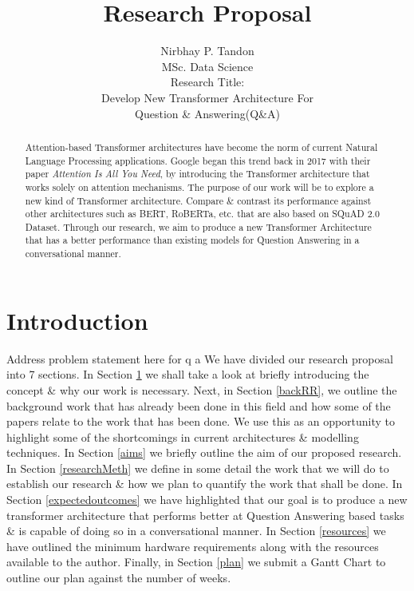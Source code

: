 \documentclass[11pt]{article}
\begin{document}
\title{Research Proposal}

\author{Nirbhay P. Tandon\\MSc. Data Science\\
    Research Title:\\Develop New Transformer Architecture For \\ Question \& Answering(Q\&A)
}
\date{}
\maketitle

\newpage
\begin{abstract}
Attention-based Transformer architectures have become the norm of current Natural Language Processing applications. Google began this trend back in 2017 with their paper \textit{Attention Is All You Need}\citet*{atayl}, by introducing the Transformer architecture that works solely on attention mechanisms. The purpose of our work will be to explore a new kind of Transformer architecture. Compare \& contrast its performance against other architectures such as BERT\cite{bert}, RoBERTa\cite{roberta}, etc. that are also based on SQuAD 2.0 Dataset\cite{dataset}. Through our research, we aim to produce a new Transformer Architecture that has a better performance than existing models for Question Answering in a conversational manner.
\end{abstract}
\newpage
\tableofcontents
\newpage
\section{Introduction}\label{introduction}

Address problem statement here for q a
We have divided our research proposal into 7 sections.
In Section \ref{introduction} we shall take a look at briefly introducing the concept \& why our work is necessary. Next, in Section \ref{backRR}, we outline the background work that has already been done in this field and how some of the papers relate to the work that has been done. We use this as an opportunity to highlight some of the shortcomings in current architectures \& modelling techniques. In Section \ref{aims} we briefly outline the aim of our proposed research. In Section \ref{researchMeth} we define in some detail the work that we will do to establish our research \& how we plan to quantify the work that shall be done. In Section \ref{expectedoutcomes} we have highlighted that our goal is to produce a new transformer architecture that performs better at Question Answering based tasks \& is capable of doing so in a conversational manner.
In Section \ref{resources} we have outlined the minimum hardware requirements along with the resources available to the author. Finally, in Section \ref{plan} we submit a Gantt Chart to outline our plan against the number of weeks.
\end{document}
